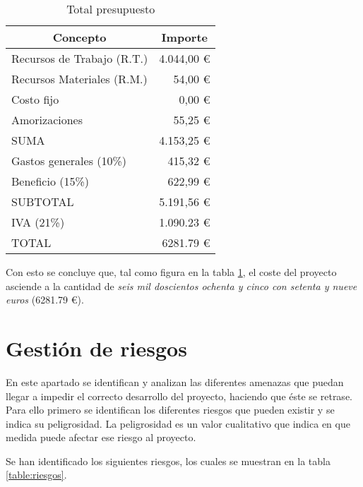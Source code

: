 \begin{table}[H]
	\centering
	\begin{tabular}{ |l|r| } 
		\hline
		\multicolumn{1}{|c|}{Concepto} & 
			\multicolumn{1}{|c|}{Importe} \\
		\hline
		Recursos de Trabajo (R.T.)	& 4.044,00 \euro	\\
		Recursos Materiales (R.M.)	& 54,00 \euro		\\
		Costo fijo					& 0,00 \euro		\\
		Amorizaciones				& 55,25 \euro		\\
		\hline
		SUMA						& 4.153,25 \euro	\\
		\hline
		Gastos generales (10\%)		& 415,32 \euro		\\
		Beneficio (15\%)			& 622,99 \euro		\\
		\hline
		SUBTOTAL					& 5.191,56 \euro	\\
		IVA (21\%)					& 1.090.23 \euro	\\
		\hline
		TOTAL						& 6281.79 \euro		\\
		\hline
	\end{tabular}
	\caption{Total presupuesto}
	\label{table:total-presupuesto}
\end{table}

Con esto se concluye que, tal como figura en la tabla \ref{table:total-presupuesto}, el coste del proyecto asciende a la cantidad de \textit{seis mil doscientos ochenta y cinco con setenta y nueve euros} (6281.79 \euro).


\section{Gestión de riesgos}

En este apartado se identifican y analizan las diferentes amenazas que puedan llegar a impedir el correcto desarrollo del proyecto, haciendo que éste se retrase. Para ello primero se identifican los diferentes riesgos que pueden existir y se indica su peligrosidad. La peligrosidad es un valor cualitativo que indica en que medida puede afectar ese riesgo al proyecto.

Se han identificado los siguientes riesgos, los cuales se muestran en la tabla \ref{table:riesgos}.

